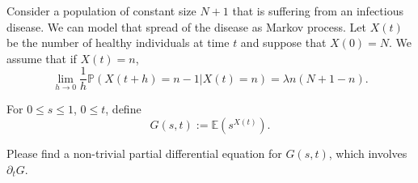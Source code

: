 \begin{exercise}\label{probability:2018:5}
Consider a population of constant size $N+1$ that is suffering from an infectious disease. We can model that spread of the disease as Markov process. Let $X(t)$ be the number of healthy individuals at time $t$ and suppose that $X(0) = N$. We assume that if $X(t) = n$,
\[
\lim_{h \to 0} \frac{1}{h}\mathbb{P}(X(t+h) = n-1 | X(t) = n) = \lambda n(N+1-n).
\]

For $0 \leq s \leq 1$, $0 \leq t$, define
\[
G(s,t) := \mathbb{E}(s^{X(t)}).
\]

Please find a non-trivial partial differential equation for $G(s,t)$, which involves $\partial_t G$.

%

%
\end{exercise}

